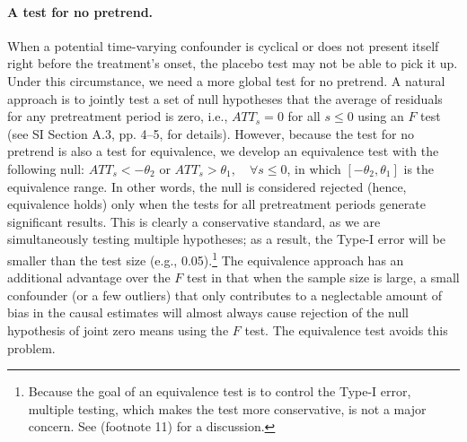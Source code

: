 \documentclass[12pt]{article}
\let\oldcenter\center
\let\oldendcenter\endcenter
\renewenvironment{center}{\setlength\topsep{0pt}\oldcenter}{\oldendcenter}
\begin{document}
\paragraph{A test for no pretrend.} When a potential time-varying confounder is cyclical or does not present itself right before the treatment's onset, the placebo test may not be able to pick it up. Under this circumstance, we need a more global test for no pretrend. A natural approach is to jointly test a set of null hypotheses that the average of residuals for any pretreatment period is zero, i.e., $ATT_{s} = 0$ for all $s\leq 0$ using an $F$ test (see SI Section A.3, pp. 4--5, for details). However, because the test for no pretrend is also a test for equivalence, we develop an equivalence test with the following null:
\begin{center}
$ATT_s < -\theta_2$ or $ATT_s > \theta_1,\quad\forall s \leq 0$,
\end{center}
in which $[-\theta_{2}, \theta_1]$ is the equivalence range. In other words, the null is considered rejected (hence, equivalence holds) only when the tests for all pretreatment periods generate significant results. This is clearly a conservative standard, as we are simultaneously testing multiple hypotheses; as a result, the Type-I error will be smaller than the test size (e.g., 0.05).\footnote{Because the goal of an equivalence test is to control the Type-I error, multiple testing, which makes the test more conservative, is not a major concern. See \citet{Hartman2020-jb} (footnote 11) for a discussion.}  The equivalence approach has an additional advantage over the $F$ test in that when the sample size is large, a small confounder (or a few outliers) that only contributes to a neglectable amount of bias in the causal estimates will almost always cause rejection of the null hypothesis of joint zero means using the $F$ test. The equivalence test avoids this problem. 
\end{document}
